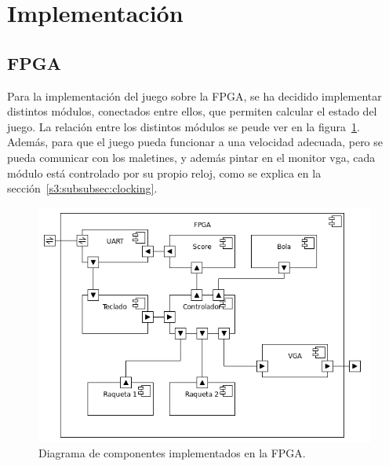 \section{Implementación}
\label{s3:sec:Implementacion}


\subsection{FPGA}
\label{s3:subsec:fpga}
Para la implementación del juego sobre la FPGA, se ha decidido implementar
distintos módulos, conectados entre ellos, que permiten calcular el estado
del juego. La relación entre los distintos módulos se peude ver en la
figura~\ref{s3:fig:componentes-fpga-a}. Además, para que el juego pueda
funcionar a una velocidad adecuada, pero se pueda comunicar con los
maletines, y además pintar en el monitor vga, cada módulo está controlado
por su propio reloj, como se explica en la sección~\ref{s3:subsubsec:clocking}.


\begin{figure}[h]
  \centering
  \includegraphics[width=1.0\textwidth]{images/fpga_componentes_v2.png}
\caption{Diagrama de componentes implementados en la FPGA. }
\label{s3:fig:componentes-fpga-a}
\end{figure}

